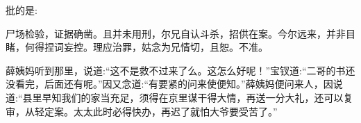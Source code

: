 \begin{parag}
    批的是:
\end{parag}


\begin{qute2sp}
    尸场检验，证据确凿。且并未用刑，尔兄自认斗杀，招供在案。今尔远来，并非目睹，何得捏词妄控。理应治罪，姑念为兄情切，且恕。不准。
\end{qute2sp}


\begin{parag}
    薛姨妈听到那里，说道:“这不是救不过来了么。这怎么好呢！”宝钗道:“二哥的书还没看完，后面还有呢。”因又念道:“有要紧的问来使便知。”薛姨妈便问来人，因说道:“县里早知我们的家当充足，须得在京里谋干得大情，再送一分大礼，还可以复审，从轻定案。太太此时必得快办，再迟了就怕大爷要受苦了。”
\end{parag}


